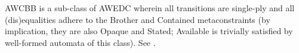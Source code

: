 AWCBB is a sub-class of AWEDC wherein all transitions are single-ply and all
(dis)equalities adhere to the Brother and Contained metaconstraints (by
implication, they are also Opaque and Stated; Available is trivially
satisfied by well-formed automata of this class).  See \cite[Sec 4.3]{tata}.

